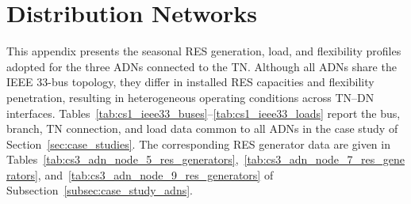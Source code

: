 \documentclass[preprint,12pt]{elsarticle}
\begin{document}
\section{Distribution Networks}
\label{app:dns_description}

This appendix presents the seasonal RES generation, load, and flexibility profiles adopted for the three ADNs connected to the TN. Although all ADNs share the IEEE 33-bus topology, they differ in installed RES capacities and flexibility penetration, resulting in heterogeneous operating conditions across TN--DN interfaces.
Tables~\ref{tab:cs1_ieee33_buses}--\ref{tab:cs1_ieee33_loads} report the bus, branch, TN connection, and load data common to all ADNs in the case study of Section~\ref{sec:case_studies}. The corresponding RES generator data are given in Tables~\ref{tab:cs3_adn_node_5_res_generators},~\ref{tab:cs3_adn_node_7_res_generators}, and~\ref{tab:cs3_adn_node_9_res_generators} of Subsection~\ref{subsec:case_study_adns}.
\end{document}
